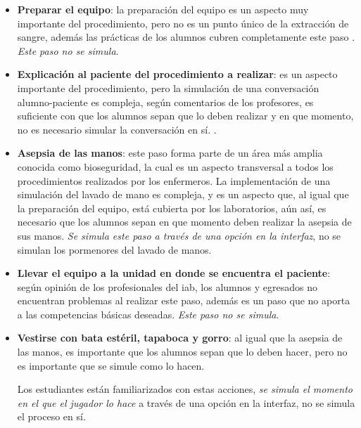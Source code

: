 \begin{itemize}

\item \textbf{Preparar el equipo}: la preparación del equipo es un aspecto muy
    importante del procedimiento, pero no es un punto único de la extracción de
    sangre, además las prácticas de los alumnos cubren completamente este paso
    . \emph{Este paso no se simula}.

\item \textbf{Explicación al paciente del procedimiento a realizar}: es un
    aspecto importante del procedimiento, pero la simulación de una conversación
    alumno-paciente es compleja, según comentarios de los profesores, es
    suficiente con que los alumnos sepan que lo deben realizar y en que momento,
    no es necesario simular la conversación en sí. .

\item \textbf{Asepsia de las manos}: este paso forma parte de un área más amplia
    conocida como bioseguridad, la cual es un aspecto transversal a todos los
    procedimientos realizados por los enfermeros. La implementación de una
    simulación del lavado de mano es compleja, y es un aspecto que, al igual que
    la preparación del equipo, está cubierta por los laboratorios, aún así, es
    necesario que los alumnos sepan en que momento deben realizar la asepsia de
    sus manos. \emph{Se simula este paso a través de una opción en la interfaz},
    no se simulan los pormenores del lavado de manos.

\item \textbf{Llevar el equipo a la unidad en donde se encuentra el paciente}:
    según opinión de los profesionales del \Gls{iab}, los alumnos y egresados no
    encuentran problemas al realizar este paso, además es un paso que no aporta
    a las competencias básicas deseadas. \emph{Este paso no se simula}.

\item \textbf{Vestirse con bata estéril, tapaboca y gorro}: al igual que la
    asepsia de las manos, es importante que los alumnos sepan que lo deben
    hacer, pero no es importante que se simule como lo hacen. 

    Los estudiantes están familiarizados con estas acciones, \emph{se simula el
        momento en el que el jugador lo hace} a través de una opción
    en la interfaz, no se simula el proceso en sí.


\end{itemize}
